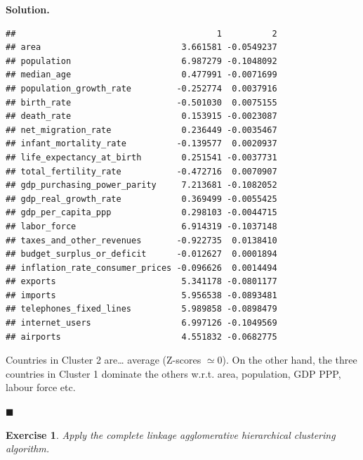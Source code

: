 \documentclass[10pt,b5paper,krantz1]{krantz}
\newtheorem{exercise}{Exercise}[chapter]
\newenvironment{solution}{%
\bigskip\noindent\textbf{Solution. }%
\it\ignorespaces%
\ignorespaces%
}{\ignorespaces%
\hfill$\blacksquare$%
}
\begin{document}
\begin{solution}
\begin{verbatim}
##                                        1          2
## area                            3.661581 -0.0549237
## population                      6.987279 -0.1048092
## median_age                      0.477991 -0.0071699
## population_growth_rate         -0.252774  0.0037916
## birth_rate                     -0.501030  0.0075155
## death_rate                      0.153915 -0.0023087
## net_migration_rate              0.236449 -0.0035467
## infant_mortality_rate          -0.139577  0.0020937
## life_expectancy_at_birth        0.251541 -0.0037731
## total_fertility_rate           -0.472716  0.0070907
## gdp_purchasing_power_parity     7.213681 -0.1082052
## gdp_real_growth_rate            0.369499 -0.0055425
## gdp_per_capita_ppp              0.298103 -0.0044715
## labor_force                     6.914319 -0.1037148
## taxes_and_other_revenues       -0.922735  0.0138410
## budget_surplus_or_deficit      -0.012627  0.0001894
## inflation_rate_consumer_prices -0.096626  0.0014494
## exports                         5.341178 -0.0801177
## imports                         5.956538 -0.0893481
## telephones_fixed_lines          5.989858 -0.0898479
## internet_users                  6.997126 -0.1049569
## airports                        4.551832 -0.0682775
\end{verbatim}

Countries in Cluster 2 are\ldots{} average (Z-scores \(\simeq 0\)).
On the other hand, the three countries in Cluster 1
dominate the others w.r.t. area, population, GDP PPP, labour force etc.

\end{solution}

\begin{exercise}

Apply the complete linkage agglomerative hierarchical clustering algorithm.

\end{exercise}
\end{document}
